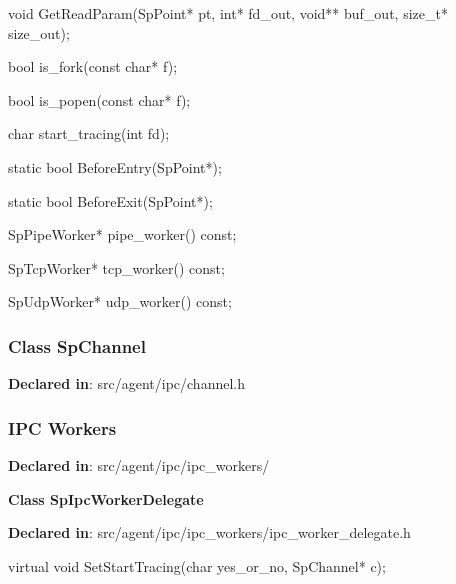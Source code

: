 \begin{apient}
void GetReadParam(SpPoint* pt,
                  int* fd_out,
                  void** buf_out,
                  size_t* size_out);
\end{apient}
\apidesc{
}

\begin{apient}
bool is_fork(const char* f);
\end{apient}
\apidesc{
}

\begin{apient}
bool is_popen(const char* f);
\end{apient}
\apidesc{
}

\begin{apient}
char start_tracing(int fd);
\end{apient}
\apidesc{
}

\begin{apient}
static bool BeforeEntry(SpPoint*);
\end{apient}
\apidesc{
}

\begin{apient}
static bool BeforeExit(SpPoint*);
\end{apient}
\apidesc{
}

\begin{apient}
SpPipeWorker* pipe_worker() const;
\end{apient}
\apidesc{
}

\begin{apient}
SpTcpWorker* tcp_worker() const;
\end{apient}
\apidesc{
}

\begin{apient}
SpUdpWorker* udp_worker() const;
\end{apient}
\apidesc{
}

\subsubsection{Class SpChannel}
\textbf{Declared in}: src/agent/ipc/channel.h

\subsubsection{IPC Workers}
\textbf{Declared in}: src/agent/ipc/ipc\_workers/

\textbf{Class SpIpcWorkerDelegate}

\textbf{Declared in}: src/agent/ipc/ipc\_workers/ipc\_worker\_delegate.h

\begin{apient}
virtual void SetStartTracing(char yes_or_no,
                             SpChannel* c);
\end{apient}
\apidesc{
}

